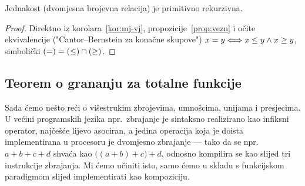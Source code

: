 \begin{korolar}[{name=[primitivna rekurzivnost jednakosti]}]\label{kor:jednakost}
Jednakost (dvomjesna brojevna relacija) je primitivno rekurzivna.
\end{korolar}
\begin{proof}
Direktno iz korolara~\ref{kor:mj-vj}, propozicije~\ref{prop:vezn} i očite ekvivalencije ("Cantor--Bernstein za konačne skupove")
    $x = y \Longleftrightarrow x\le y\land x\ge y$,
simbolički $(=)=(\le)\cap(\ge)$.%
\end{proof}

\subsection{Teorem o grananju za totalne funkcije}

Sada ćemo nešto reći o višestrukim zbrojevima, umnošcima, unijama i presjecima. U većini programskih jezika npr.\ zbrajanje je sintaksno realizirano kao infiksni operator, najčešće lijevo asociran, a jedina operacija koja je doista implementirana u procesoru je dvomjesno zbrajanje --- tako da se npr.\ $a+b+c+d$ shvaća kao $\bigl((a+b)+c\bigr)+d$, odnosno kompilira se kao slijed tri instrukcije zbrajanja. Mi ćemo učiniti isto, samo ćemo u skladu s funkcijskom paradigmom slijed implementirati kao kompoziciju.

